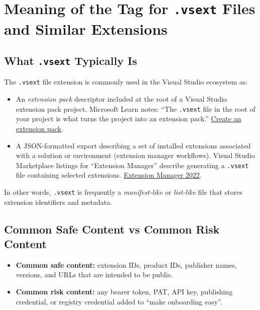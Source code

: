 \documentclass[11pt]{article}
\newcommand{\codeinline}[1]{\texttt{#1}}
\begin{document}
\section{Meaning of the Tag for \codeinline{.vsext} Files and Similar Extensions}
\subsection{What \codeinline{.vsext} Typically Is}
The \codeinline{.vsext} file extension is commonly used in the Visual Studio ecosystem as:
\begin{itemize}
  \item An \emph{extension pack} descriptor included at the root of a Visual Studio extension pack project. Microsoft Learn notes: ``The \codeinline{.vsext} file in the root of your project is what turns the project into an extension pack.'' \href{https://learn.microsoft.com/en-us/visualstudio/extensibility/vsix/publish/create-extension-pack?view=visualstudio}{Create an extension pack}.
  \item A JSON-formatted export describing a set of installed extensions associated with a solution or environment (extension manager workflows). Visual Studio Marketplace listings for ``Extension Manager'' describe generating a \codeinline{.vsext} file containing selected extensions. \href{https://marketplace.visualstudio.com/items?itemName=Loop8ack.ExtensionManager2022}{Extension Manager 2022}.
\end{itemize}

In other words, \codeinline{.vsext} is frequently a \emph{manifest-like} or \emph{list-like} file that stores extension identifiers and metadata.

\subsection{Common Safe Content vs Common Risk Content}
\begin{itemize}
  \item \textbf{Common safe content:} extension IDs, product IDs, publisher names, versions, and URLs that are intended to be public.
  \item \textbf{Common risk content:} any bearer token, PAT, API key, publishing credential, or registry credential added to ``make onboarding easy''.
\end{itemize}
\end{document}
